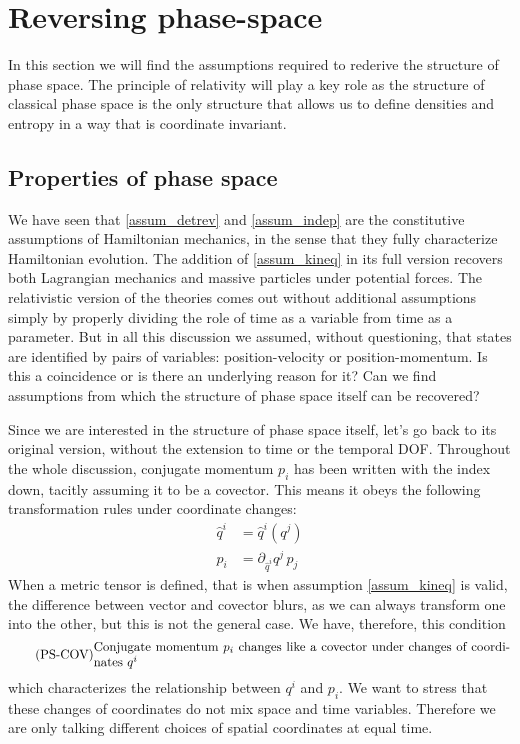 \section{Reversing phase-space}

In this section we will find the assumptions required to rederive the structure of phase space. The principle of relativity will play a key role as the structure of classical phase space is the only structure that allows us to define densities and entropy in a way that is coordinate invariant.


\subsection{Properties of phase space}

We have seen that \ref{assum_detrev} and \ref{assum_indep} are the constitutive assumptions of Hamiltonian mechanics, in the sense that they fully characterize Hamiltonian evolution. The addition of \ref{assum_kineq} in its full version recovers both Lagrangian mechanics and massive particles under potential forces. The relativistic version of the theories comes out without additional assumptions simply by properly dividing the role of time as a variable from time as a parameter. But in all this discussion we assumed, without questioning, that states are identified by pairs of variables: position-velocity or position-momentum. Is this a coincidence or is there an underlying reason for it? Can we find assumptions from which the structure of phase space itself can be recovered?

Since we are interested in the structure of phase space itself, let's go back to its original version, without the extension to time or the temporal DOF. Throughout the whole discussion, conjugate momentum $p_i$ has been written with the index down, tacitly assuming it to be a covector. This means it obeys the following transformation rules under coordinate changes:
\begin{equation}
	\begin{aligned}
 \hat{q}^i &= \hat{q}^i(q^j) \\
 \hat{p}_i &= \partial_{\hat{q}^i} q^j  \, p_j
	\end{aligned}
\end{equation}
When a metric tensor is defined, that is when assumption \ref{assum_kineq} is valid, the difference between vector and covector blurs, as we can always transform one into the other, but this is not the general case. We have, therefore, this condition
\begin{equation}
	\tag{PS-COV}\label{rp-cm-ps-condMomentumCovector}
	\eqtext{Conjugate momentum $p_i$ changes like a covector under changes of coordinates $q^i$}
\end{equation}
which characterizes the relationship between $q^i$ and $p_i$. We want to stress that these changes of coordinates do not mix space and time variables. Therefore we are only talking different choices of spatial coordinates at equal time.

